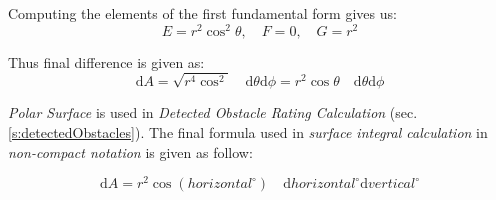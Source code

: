 \noindent Computing the elements of the first fundamental form gives us:
\begin{equation}
    E = r^2\cos^2\theta,\quad F=0,\quad G=r^2
\end{equation}

\noindent Thus final difference is given as:
\begin{equation}\label{eq:finalCellSquareNice}
    \text{d}A=\sqrt{r^4\cos^2}\quad \text{d}\theta\text{d}\phi = r^2 \cos\theta\quad \text{d}\theta\text{d}\phi
\end{equation}

\begin{note} 
    \emph{Polar Surface} is used in \emph{Detected Obstacle Rating Calculation} (sec. \ref{s:detectedObstacles}). The final formula used in \emph{surface integral calculation} in \emph{non-compact notation} is given as follow:

    \begin{equation}\label{eq:finalCellSquare}
        \text{d}A= r^2 \cos(horizontal^\circ)\quad \text{d}horizontal^\circ \text{d}vertical^\circ
    \end{equation}
\end{note}